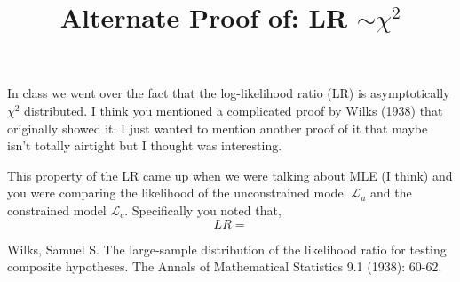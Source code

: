 \documentclass[a4paper]{article}
\title{Alternate Proof of: LR $ \sim \chi^2$}
\begin{document}
\maketitle
In class we went over the fact that the log-likelihood ratio (LR) is asymptotically
$\chi^2$ distributed. I think you mentioned a complicated proof by Wilks (1938)
\cite{wilks38} that originally showed it. I just wanted to mention another proof of
it that maybe isn't totally airtight but I thought was interesting.

This property of the LR came up when we were talking about MLE (I think) and you
were comparing the likelihood of the unconstrained model $\mathcal{L}_u$ and the
constrained model $\mathcal{L}_c$. Specifically you noted that,
$$
LR =
$$



\newpage
\renewcommand{\refname}{References}
\begin{thebibliography}{9}
	Wilks, Samuel S. The large-sample distribution of the likelihood ratio for testing composite hypotheses. The Annals of Mathematical Statistics 9.1 (1938): 60-62.
\end{thebibliography}
\end{document}
